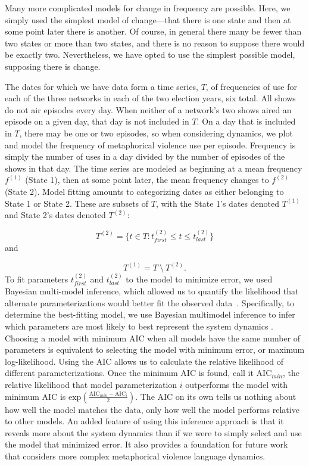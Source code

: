 Many more complicated models for change in frequency are possible. Here, we
simply used the simplest model of change---that there is one state and then at
some point later there is another.  Of course, in general there many be fewer
than two states or more than two states, and there is no reason to suppose there
would be exactly two.  Nevertheless, we have opted to use the simplest possible
model, supposing there is change.

The dates for which we have data form a time series, $T$, of frequencies of use
for each of the three networks in each of the two election years, six total. All
shows do not air episodes every day. When neither of a network's two shows aired
an episode on a given day, that day is not included in $T$. On a day that is
included in $T$, there may be one or two episodes, so when considering dynamics,
we plot and model the frequency of metaphorical violence use per episode.
Frequency is simply the number of uses in a day divided by the number of
episodes of the shows in that day. The time series are modeled as beginning at a
mean frequency $f^{(1)}$ (State 1), then at some point later, the mean frequency
changes to $f^{(2)}$ (State 2). Model fitting amounts to categorizing dates as
either belonging to State 1 or State 2. These are subsets of $T$, with the State
1's dates denoted $T^{(1)}$ and State 2's dates denoted $T^{(2)}$:

\[ T^{(2)} = \{t \in T: t_{first}^{(2)} \leq t \leq t_{last}^{(2)} \} \]
\noindent and 

\[ T^{(1)} = T~\setminus~T^{(2)}.  \] \noindent To fit parameters
$t_{first}^{(2)}$ and $t_{last}^{(2)}$ to the model to minimize error, we used
Bayesian multi-model inference, which allowed us to quantify the likelihood that
alternate parameterizations would better fit the observed
data~\cite{Burnham2011}. Specifically, to determine the best-fitting model, we
use Bayesian multimodel inference to infer which parameters are most likely to
best represent the system dynamics \cite{Burnham2011}.  Choosing a model with
minimum AIC when all models have the same number of parameters is equivalent to
selecting the model with minimum error, or maximum log-likelihood. Using the AIC
allows us to calculate the relative likelihood of different parameterizations.
Once the minimum AIC is found, call it $\text{AIC}_{min}$, the relative
likelihood that model parameterization $i$ outperforms the model with minimum
AIC is $\text{exp}(\frac{\text{AIC}_{min} - \text{AIC}_i}{2})$. The AIC on
its own tells us nothing about how well the model matches the data, only  how
well the model performs relative to other models. An added feature of using this
inference approach is that it reveals more about the system dynamics than if we
were to simply select and use the  model that minimized error. It also provides
a foundation for future work that considers more complex metaphorical violence
language dynamics. 

